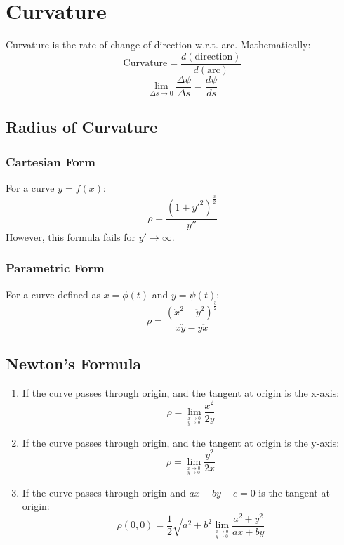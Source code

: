 \section{Curvature}
Curvature is the rate of change of direction w.r.t. arc. Mathematically:
\begin{equation}
	\text{Curvature}=\dfrac{d(\text{direction})}{d(\text{arc})}\nonumber
\end{equation}
\begin{equation}
	\lim_{\Delta s \to 0} \dfrac{\Delta \psi}{\Delta s}=\dfrac{d\psi}{ds}
\end{equation}

\subsection{Radius of Curvature}
\subsubsection{Cartesian Form}
For a curve $y=f(x)$:
\begin{equation}
	\rho=\dfrac{(1+y'^2)^{\frac{3}{2}}}{y''}
\end{equation}
However, this formula fails for $y'\to\infty$.
\subsubsection{Parametric Form}
For a curve defined as $x=\phi(t)$ and $y=\psi(t)$:
\begin{equation}
	\rho=\dfrac{(\ddot{x}^2+\ddot{y}^2)^{\frac{3}{2}}}{x\ddot{y}-y\ddot{x}}
\end{equation}

\subsection{Newton's Formula}
\begin{enumerate}
	\item If the curve passes through origin, and the tangent at origin is the x-axis:
	\begin{equation}
		\rho=\lim_{^{x\to0}_{y\to0}} \dfrac{x^2}{2y}
	\end{equation}
	\item If the curve passes through origin, and the tangent at origin is the y-axis:
	\begin{equation}
		\rho=\lim_{^{x\to0}_{y\to0}} \dfrac{y^2}{2x}
	\end{equation}
	\item If the curve passes through origin and $ax+by+c=0$ is the tangent at origin:
	\begin{equation}
		\rho(0,0)=\dfrac{1}{2}\sqrt{a^2+b^2} \lim_{^{x\to0}_{y\to0}} \dfrac{a^2+y^2}{ax+by}
	\end{equation}
\end{enumerate}

